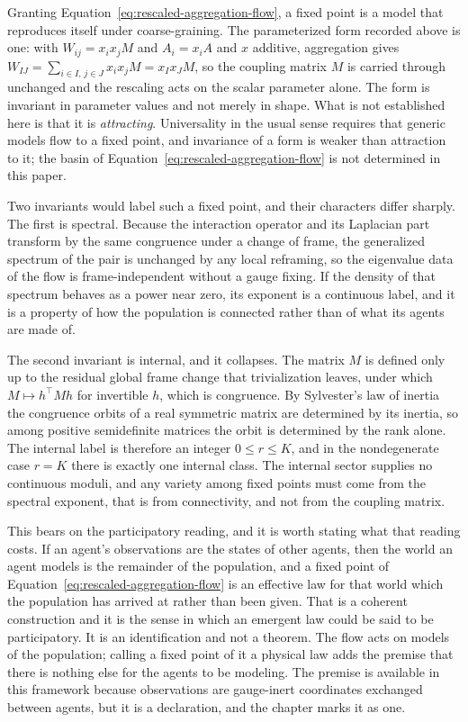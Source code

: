 Granting Equation~\eqref{eq:rescaled-aggregation-flow}, a fixed point is a model that reproduces itself under coarse-graining. The parameterized form recorded above is one: with \(W_{ij}=x_ix_jM\) and \(A_i=x_iA\) and \(x\) additive, aggregation gives \(W_{IJ}=\sum_{i\in I,\,j\in J}x_ix_jM=x_Ix_JM\), so the coupling matrix \(M\) is carried through unchanged and the rescaling acts on the scalar parameter alone. The form is invariant in parameter values and not merely in shape. What is not established here is that it is \emph{attracting}. Universality in the usual sense requires that generic models flow to a fixed point, and invariance of a form is weaker than attraction to it; the basin of Equation~\eqref{eq:rescaled-aggregation-flow} is not determined in this paper.

Two invariants would label such a fixed point, and their characters differ sharply. The first is spectral. Because the interaction operator and its Laplacian part transform by the same congruence under a change of frame, the generalized spectrum of the pair is unchanged by any local reframing, so the eigenvalue data of the flow is frame-independent without a gauge fixing. If the density of that spectrum behaves as a power near zero, its exponent is a continuous label, and it is a property of how the population is connected rather than of what its agents are made of.

The second invariant is internal, and it collapses. The matrix \(M\) is defined only up to the residual global frame change that trivialization leaves, under which \(M\mapsto h^{\top}Mh\) for invertible \(h\), which is congruence. By Sylvester's law of inertia the congruence orbits of a real symmetric matrix are determined by its inertia, so among positive semidefinite matrices the orbit is determined by the rank alone. The internal label is therefore an integer \(0\leq r\leq K\), and in the nondegenerate case \(r=K\) there is exactly one internal class. The internal sector supplies no continuous moduli, and any variety among fixed points must come from the spectral exponent, that is from connectivity, and not from the coupling matrix.

This bears on the participatory reading, and it is worth stating what that reading costs. If an agent's observations are the states of other agents, then the world an agent models is the remainder of the population, and a fixed point of Equation~\eqref{eq:rescaled-aggregation-flow} is an effective law for that world which the population has arrived at rather than been given. That is a coherent construction and it is the sense in which an emergent law could be said to be participatory. It is an identification and not a theorem. The flow acts on models of the population; calling a fixed point of it a physical law adds the premise that there is nothing else for the agents to be modeling. The premise is available in this framework because observations are gauge-inert coordinates exchanged between agents, but it is a declaration, and the chapter marks it as one.

